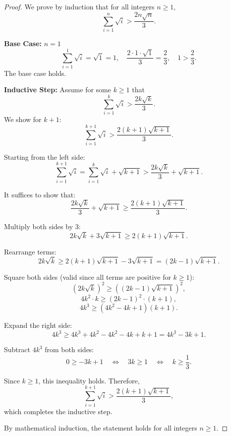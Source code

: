\documentclass{article}
\begin{document}
\begin{proof}
We prove by induction that for all integers $n \geq 1$,
\[
\sum_{i=1}^{n} \sqrt{i} > \frac{2n\sqrt{n}}{3}.
\]

\textbf{Base Case: } $n = 1$
\[
\sum_{i=1}^{1} \sqrt{i} = \sqrt{1} = 1, \quad \frac{2 \cdot 1 \cdot \sqrt{1}}{3} = \frac{2}{3}, \quad 1 > \frac{2}{3}.
\]
The base case holds.

\textbf{Inductive Step: } Assume for some $k \geq 1$ that
\[
\sum_{i=1}^{k} \sqrt{i} > \frac{2k\sqrt{k}}{3}.
\]
We show for $k + 1$:
\[
\sum_{i=1}^{k+1} \sqrt{i} > \frac{2(k+1)\sqrt{k+1}}{3}.
\]

Starting from the left side:
\[
\sum_{i=1}^{k+1} \sqrt{i} = \sum_{i=1}^{k} \sqrt{i} + \sqrt{k+1} > \frac{2k\sqrt{k}}{3} + \sqrt{k+1}.
\]

It suffices to show that:
\[
\frac{2k\sqrt{k}}{3} + \sqrt{k+1} \geq \frac{2(k+1)\sqrt{k+1}}{3}.
\]

Multiply both sides by 3:
\[
2k\sqrt{k} + 3\sqrt{k+1} \geq 2(k+1)\sqrt{k+1}.
\]

Rearrange terms:
\[
2k\sqrt{k} \geq 2(k+1)\sqrt{k+1} - 3\sqrt{k+1} = (2k - 1)\sqrt{k+1}.
\]

Square both sides (valid since all terms are positive for $k \geq 1$):
\[
(2k\sqrt{k})^2 \geq ((2k - 1)\sqrt{k+1})^2,
\]
\[
4k^2 \cdot k \geq (2k - 1)^2 \cdot (k + 1),
\]
\[
4k^3 \geq (4k^2 - 4k + 1)(k + 1).
\]

Expand the right side:
\[
4k^3 \geq 4k^3 + 4k^2 - 4k^2 - 4k + k + 1 = 4k^3 - 3k + 1.
\]

Subtract $4k^3$ from both sides:
\[
0 \geq -3k + 1 \quad \Longleftrightarrow \quad 3k \geq 1 \quad \Longleftrightarrow \quad k \geq \frac{1}{3}.
\]

Since $k \geq 1$, this inequality holds. Therefore,
\[
\sum_{i=1}^{k+1} \sqrt{i} > \frac{2(k+1)\sqrt{k+1}}{3},
\]
which completes the inductive step.

By mathematical induction, the statement holds for all integers $n \geq 1$.
\end{proof}
\end{document}
